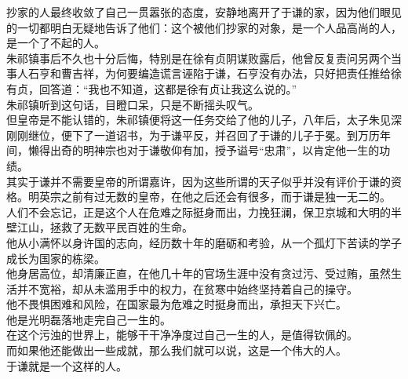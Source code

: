 \begin{multicols}{\theparacolNo}
抄家的人最终收敛了自己一贯嚣张的态度，安静地离开了于谦的家，因为他们眼见的一切都明白无疑地告诉了他们：这个被他们抄家的对象，是一个人品高尚的人，是一个了不起的人。\\

朱祁镇事后不久也十分后悔，特别是在徐有贞阴谋败露后，他曾反复责问另两个当事人石亨和曹吉祥，为何要编造谎言诬陷于谦，石亨没有办法，只好把责任推给徐有贞，回答道：“我也不知道，这都是徐有贞让我这么说的。”\\

朱祁镇听到这句话，目瞪口呆，只是不断摇头叹气。\\

但皇帝是不能认错的，朱祁镇便将这一任务交给了他的儿子，八年后，太子朱见深刚刚继位，便下了一道诏书，为于谦平反，并召回了于谦的儿子于冕。到万历年间，懒得出奇的明神宗也对于谦敬仰有加，授予谥号“忠肃”，以肯定他一生的功绩。\\

其实于谦并不需要皇帝的所谓嘉许，因为这些所谓的天子似乎并没有评价于谦的资格。明英宗之前有过无数的皇帝，在他之后还会有很多，而于谦是独一无二的。\\

人们不会忘记，正是这个人在危难之际挺身而出，力挽狂澜，保卫京城和大明的半壁江山，拯救了无数平民百姓的生命。\\

他从小满怀以身许国的志向，经历数十年的磨砺和考验，从一个孤灯下苦读的学子成长为国家的栋梁。\\

他身居高位，却清廉正直，在他几十年的官场生涯中没有贪过污、受过贿，虽然生活并不宽裕，却从未滥用手中的权力，在贫寒中始终坚持着自己的操守。\\

他不畏惧困难和风险，在国家最为危难之时挺身而出，承担天下兴亡。\\

他是光明磊落地走完自己一生的。\\

在这个污浊的世界上，能够干干净净度过自己一生的人，是值得钦佩的。\\

而如果他还能做出一些成就，那么我们就可以说，这是一个伟大的人。\\

于谦就是一个这样的人。\\


\end{multicols}
